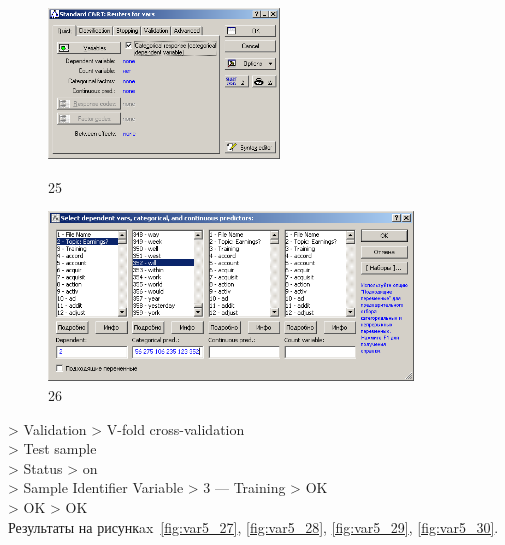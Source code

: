 \begin{figure}[!h]
  \centering

  \begin{minipage}{0.29\textwidth}
    \centering

    \includegraphics[height=4cm]
    {inc/var5/25.PNG}

    \caption{25}

    \label{fig:var5_25}
  \end{minipage}
  \begin{minipage}{0.69\textwidth}
    \centering

    \includegraphics[height=4.5cm]
    {inc/var5/26.PNG}

    \caption{26}

    \label{fig:var5_26}
  \end{minipage}
\end{figure}

> Validation > V-fold cross-validation \\
> Test sample \\
> Status > on \\
> Sample Identifier Variable > 3 — Training > OK \\
> OK > OK \\

Результаты на рисункax~\ref{fig:var5_27}, \ref{fig:var5_28}, \ref{fig:var5_29}, \ref{fig:var5_30}.

